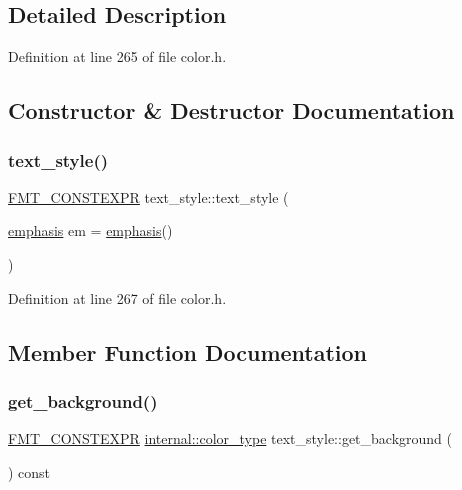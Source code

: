 \subsection{Detailed Description}


Definition at line 265 of file color.\+h.



\subsection{Constructor \& Destructor Documentation}
\mbox{\label{classtext__style_a67f289d8275892ad458966e9d44cd246}} 
\subsubsection{\texorpdfstring{text\+\_\+style()}{text\_style()}}
{\footnotesize\ttfamily \hyperlink{core_8h_a69201cb276383873487bf68b4ef8b4cd}{F\+M\+T\+\_\+\+C\+O\+N\+S\+T\+E\+X\+PR} text\+\_\+style\+::text\+\_\+style (\begin{DoxyParamCaption}\item[{\hyperlink{color_8h_a535b59b8edc8902bb3c4f254625f91ba}{emphasis}}]{em = {\ttfamily \hyperlink{color_8h_a535b59b8edc8902bb3c4f254625f91ba}{emphasis}()} }\end{DoxyParamCaption})\hspace{0.3cm}{\ttfamily [inline]}}



Definition at line 267 of file color.\+h.



\subsection{Member Function Documentation}
\mbox{\label{classtext__style_a00fb4a1cc65844bc819f71a80050181f}} 
\subsubsection{\texorpdfstring{get\+\_\+background()}{get\_background()}}
{\footnotesize\ttfamily \hyperlink{core_8h_a69201cb276383873487bf68b4ef8b4cd}{F\+M\+T\+\_\+\+C\+O\+N\+S\+T\+E\+X\+PR} \hyperlink{structinternal_1_1color__type}{internal\+::color\+\_\+type} text\+\_\+style\+::get\+\_\+background (\begin{DoxyParamCaption}{ }\end{DoxyParamCaption}) const\hspace{0.3cm}{\ttfamily [inline]}}




